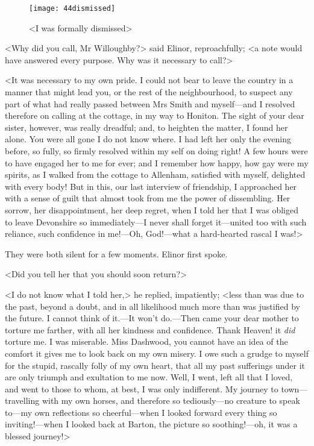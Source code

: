 \begin{figure}[tbph]
\centering
\texttt{[image: 44dismissed]}
\caption{<I was formally dismissed>}
\end{figure}

<Why did you call, Mr Willoughby?> said Elinor, reproachfully; <a note would have answered every purpose. Why was it necessary to call?>

<It was necessary to my own pride. I could not bear to leave the country in a manner that might lead you, or the rest of the neighbourhood, to suspect any part of what had really passed between Mrs Smith and myself—and I resolved therefore on calling at the cottage, in my way to Honiton. The sight of your dear sister, however, was really dreadful; and, to heighten the matter, I found her alone. You were all gone I do not know where. I had left her only the evening before, so fully, so firmly resolved within my self on doing right! A few hours were to have engaged her to me for ever; and I remember how happy, how gay were my spirits, as I walked from the cottage to Allenham, satisfied with myself, delighted with every body! But in this, our last interview of friendship, I approached her with a sense of guilt that almost took from me the power of dissembling. Her sorrow, her disappointment, her deep regret, when I told her that I was obliged to leave Devonshire so immediately—I never shall forget it—united too with such reliance, such confidence in me!—Oh, God!—what a hard-hearted rascal I was!>

They were both silent for a few moments. Elinor first spoke.

<Did you tell her that you should soon return?>

<I do not know what I told her,> he replied, impatiently; <less than was due to the past, beyond a doubt, and in all likelihood much more than was justified by the future. I cannot think of it.—It won't do.—Then came your dear mother to torture me farther, with all her kindness and confidence. Thank Heaven! it \textit{did} torture me. I was miserable. Miss Dashwood, you cannot have an idea of the comfort it gives me to look back on my own misery. I owe such a grudge to myself for the stupid, rascally folly of my own heart, that all my past sufferings under it are only triumph and exultation to me now. Well, I went, left all that I loved, and went to those to whom, at best, I was only indifferent. My journey to town—travelling with my own horses, and therefore so tediously—no creature to speak to—my own reflections so cheerful—when I looked forward every thing so inviting!—when I looked back at Barton, the picture so soothing!—oh, it was a blessed journey!>

